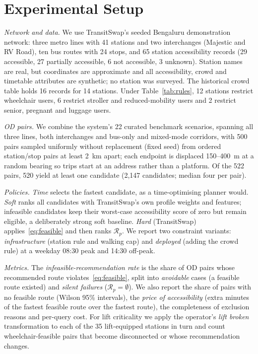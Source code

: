 \documentclass[conference]{IEEEtran}
\begin{document}
\section{Experimental Setup}\label{sec:setup}

\textit{Network and data.} We use TransitSwap's seeded Bengaluru demonstration network: three metro lines with 41 stations and two interchanges (Majestic and RV Road), ten bus routes with 24 stops, and 65 station accessibility records (29 accessible, 27 partially accessible, 6 not accessible, 3 unknown). Station names are real, but coordinates are approximate and all accessibility, crowd and timetable attributes are synthetic; no station was surveyed. The historical crowd table holds 16 records for 14 stations. Under Table~\ref{tab:rules}, 12 stations restrict wheelchair users, 6 restrict stroller and reduced-mobility users and 2 restrict senior, pregnant and luggage users.

\textit{OD pairs.} We combine the system's 22 curated benchmark scenarios, spanning all three lines, both interchanges and bus-only and mixed-mode corridors, with 500 pairs sampled uniformly without replacement (fixed seed) from ordered station/stop pairs at least 2~km apart; each endpoint is displaced 150--400~m at a random bearing so trips start at an address rather than a platform. Of the 522 pairs, 520 yield at least one candidate (2,147 candidates; median four per pair).

\textit{Policies.} \emph{Time} selects the fastest candidate, as a time-optimising planner would. \emph{Soft} ranks all candidates with TransitSwap's own profile weights and features; infeasible candidates keep their worst-case accessibility score of zero but remain eligible, a deliberately strong soft baseline. \emph{Hard} (TransitSwap) applies~\eqref{eq:feasible} and then ranks $\mathcal{R}_p$. We report two constraint variants: \emph{infrastructure} (station rule and walking cap) and \emph{deployed} (adding the crowd rule) at a weekday 08:30 peak and 14:30 off-peak.

\textit{Metrics.} The \emph{infeasible-recommendation rate} is the share of OD pairs whose recommended route violates~\eqref{eq:feasible}, split into \emph{avoidable} cases (a feasible route existed) and \emph{silent failures} ($\mathcal{R}_p = \emptyset$). We also report the share of pairs with no feasible route (Wilson 95\% intervals), the \emph{price of accessibility} (extra minutes of the fastest feasible route over the fastest route), the completeness of exclusion reasons and per-query cost. For lift criticality we apply the operator's \emph{lift broken} transformation to each of the 35 lift-equipped stations in turn and count wheelchair-feasible pairs that become disconnected or whose recommendation changes.
\end{document}
